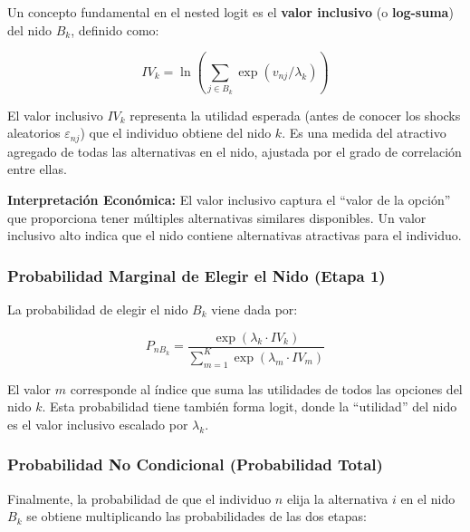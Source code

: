 \documentclass[
]{book}
\begin{document}
Un concepto fundamental en el nested logit es el \textbf{valor inclusivo} (o \textbf{log-suma}) del nido \(B_k\), definido como:

\begin{equation}
IV_k = \ln\left(\sum_{j \in B_k} \exp(v_{nj}/\lambda_k)\right)
\label{eq:inclusivevalue}
\end{equation}

El valor inclusivo \(IV_k\) representa la utilidad esperada (antes de conocer los shocks aleatorios \(\varepsilon_{nj}\)) que el individuo obtiene del nido \(k\). Es una medida del atractivo agregado de todas las alternativas en el nido, ajustada por el grado de correlación entre ellas.

\textbf{Interpretación Económica:} El valor inclusivo captura el ``valor de la opción'' que proporciona tener múltiples alternativas similares disponibles. Un valor inclusivo alto indica que el nido contiene alternativas atractivas para el individuo.

\hypertarget{probabilidad-marginal-de-elegir-el-nido-etapa-1}{%
\subsubsection{Probabilidad Marginal de Elegir el Nido (Etapa 1)}\label{probabilidad-marginal-de-elegir-el-nido-etapa-1}}

La probabilidad de elegir el nido \(B_k\) viene dada por:

\begin{equation}
P_{nB_k} = \frac{\exp(\lambda_k \cdot IV_k)}{\sum_{m=1}^K \exp(\lambda_m \cdot IV_m)}
\label{eq:nestprob}
\end{equation}

El valor \(m\) corresponde al índice que suma las utilidades de todos las opciones del nido \(k\). Esta probabilidad tiene también forma logit, donde la ``utilidad'' del nido es el valor inclusivo escalado por \(\lambda_k\).

\hypertarget{probabilidad-no-condicional-probabilidad-total}{%
\subsubsection{Probabilidad No Condicional (Probabilidad Total)}\label{probabilidad-no-condicional-probabilidad-total}}

Finalmente, la probabilidad de que el individuo \(n\) elija la alternativa \(i\) en el nido \(B_k\) se obtiene multiplicando las probabilidades de las dos etapas:
\end{document}
